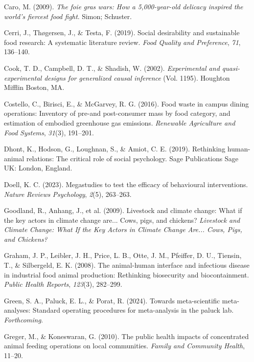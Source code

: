 \documentclass[
  man]{apa6}
\newlength{\cslhangindent}
\newenvironment{CSLReferences}[2] %
 {\begin{list}{}{%
  \setlength{\itemindent}{0pt}
  \setlength{\leftmargin}{0pt}
  \setlength{\parsep}{0pt}
  \ifodd #1
   \setlength{\leftmargin}{\cslhangindent}
   \setlength{\itemindent}{-1\cslhangindent}
  \fi
  \setlength{\itemsep}{#2\baselineskip}}}
 {\end{list}}
\begin{document}
\begin{CSLReferences}{1}{0}
Caro, M. (2009). \emph{The foie gras wars: How a 5,000-year-old delicacy inspired the world's fiercest food fight}. Simon; Schuster.

Cerri, J., Thøgersen, J., \& Testa, F. (2019). Social desirability and sustainable food research: A systematic literature review. \emph{Food Quality and Preference}, \emph{71}, 136--140.

Cook, T. D., Campbell, D. T., \& Shadish, W. (2002). \emph{Experimental and quasi-experimental designs for generalized causal inference} (Vol. 1195). Houghton Mifflin Boston, MA.

Costello, C., Birisci, E., \& McGarvey, R. G. (2016). Food waste in campus dining operations: Inventory of pre-and post-consumer mass by food category, and estimation of embodied greenhouse gas emissions. \emph{Renewable Agriculture and Food Systems}, \emph{31}(3), 191--201.

Dhont, K., Hodson, G., Loughnan, S., \& Amiot, C. E. (2019). Rethinking human-animal relations: The critical role of social psychology. Sage Publications Sage UK: London, England.

Doell, K. C. (2023). Megastudies to test the efficacy of behavioural interventions. \emph{Nature Reviews Psychology}, \emph{2}(5), 263--263.

Goodland, R., Anhang, J., et al. (2009). Livestock and climate change: What if the key actors in climate change are... Cows, pigs, and chickens? \emph{Livestock and Climate Change: What If the Key Actors in Climate Change Are... Cows, Pigs, and Chickens?}

Graham, J. P., Leibler, J. H., Price, L. B., Otte, J. M., Pfeiffer, D. U., Tiensin, T., \& Silbergeld, E. K. (2008). The animal-human interface and infectious disease in industrial food animal production: Rethinking biosecurity and biocontainment. \emph{Public Health Reports}, \emph{123}(3), 282--299.

Green, S. A., Paluck, E. L., \& Porat, R. (2024). Towards meta-scientific meta-analyses: Standard operating procedures for meta-analysis in the paluck lab. \emph{Forthcoming}.

Greger, M., \& Koneswaran, G. (2010). The public health impacts of concentrated animal feeding operations on local communities. \emph{Family and Community Health}, 11--20.


\end{CSLReferences}
\end{document}
